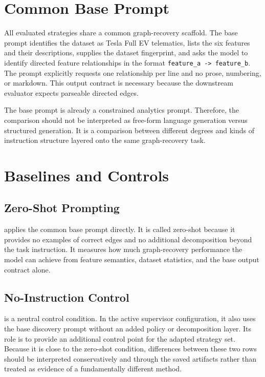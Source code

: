 \section{Common Base Prompt}

All evaluated strategies share a common graph-recovery scaffold. The base
prompt identifies the dataset as Tesla Full EV telematics, lists the six
features and their descriptions, supplies the dataset fingerprint, and asks
the model to identify directed feature relationships in the format
\texttt{feature\_a -> feature\_b}. The prompt explicitly requests one
relationship per line and no prose, numbering, or markdown. This output
contract is necessary because the downstream evaluator expects parseable
directed edges.

The base prompt is already a constrained analytics prompt. Therefore, the
comparison should not be interpreted as free-form language generation versus
structured generation. It is a comparison between different degrees and kinds
of instruction structure layered onto the same graph-recovery task.

\section{Baselines and Controls}

\subsection{Zero-Shot Prompting}

 applies the common base prompt
directly. It is called zero-shot because it provides no examples of correct
edges and no additional decomposition beyond the task instruction. It measures
how much graph-recovery performance the model can achieve from feature
semantics, dataset statistics, and the base output contract alone.

\subsection{No-Instruction Control}

 is a neutral control condition.
In the active supervisor configuration, it also uses the base discovery prompt
without an added policy or decomposition layer. Its role is to provide an
additional control point for the adapted strategy set. Because it is close to
the zero-shot condition, differences between these two rows should be
interpreted conservatively and through the saved artifacts rather than treated
as evidence of a fundamentally different method.

